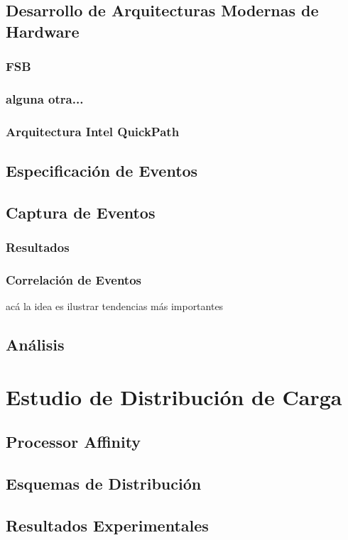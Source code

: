 \subsection{Desarrollo de Arquitecturas Modernas de Hardware}
\subsubsection{FSB}
\subsubsection{alguna otra...}
\subsubsection{Arquitectura Intel QuickPath}

\subsection{Especificación de Eventos}
\subsection{Captura de Eventos}
\subsubsection{Resultados}
\subsubsection{Correlación de Eventos}
acá la idea es ilustrar tendencias más importantes
\subsection{Análisis}

\section{Estudio de Distribución de Carga}
\subsection{Processor Affinity}
\subsection{Esquemas de Distribución}
\subsection{Resultados Experimentales}